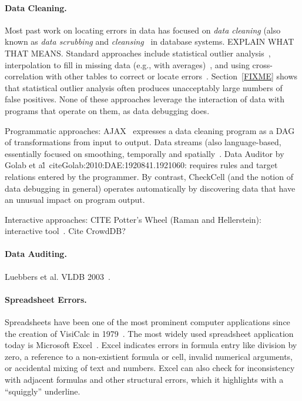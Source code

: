 
\paragraph{Data Cleaning.}
Most past work on locating errors in data has focused on \emph{data
cleaning} (also known as \emph{data scrubbing}
and \emph{cleansing}~\cite{DBLP:journals/debu/RahmD00} in database
systems. EXPLAIN WHAT THAT MEANS. Standard approaches include
statistical outlier analysis~\cite{FIXME}, interpolation to fill in
missing data (e.g., with averages)~\cite{FIXME}, and using
cross-correlation with other tables to correct or locate
errors~\cite{FIXME}. Section~\ref{FIXME} shows that statistical
outlier analysis often produces unacceptably large numbers of false
positives. None of these approaches leverage the interaction of data
with programs that operate on them, as data debugging does.


Programmatic approaches: AJAX~\cite{Galhardas:2000:AED:342009.336568}
expresses a data cleaning program as a DAG of transformations from
input to output. Data streams (also language-based, essentially
focused on smoothing, temporally and spatially~\cite{1617508}. Data
Auditor by Golab et al\.~cite{Golab:2010:DAE:1920841.1921060}:
requires rules and target relations entered by the programmer. By
contrast, CheckCell (and the notion of data debugging in general)
operates automatically by discovering data that have an unusual impact
on program output.

Interactive approaches: CITE Potter's Wheel (Raman and Hellerstein):
interactive tool~\cite{Raman:2001:PWI:645927.672045}. Cite CrowdDB?

\paragraph{Data Auditing.}
Luebbers et al. VLDB 2003~\cite{Luebbers:2003:SDD:1315451.1315499}.

\paragraph{Spreadsheet Errors.}
Spreadsheets have been one of the most prominent computer applications
since the creation of VisiCalc in 1979~\cite{FIXME}. The most widely
used spreadsheet application today is Microsoft Excel~\cite{}. Excel
indicates errors in formula entry like division by zero, a reference
to a non-existient formula or cell, invalid numerical arguments, or
accidental mixing of text and numbers.
Excel can also check for inconsistency with adjacent formulas and other structural errors, which it
highlights with a ``squiggly'' underline.

